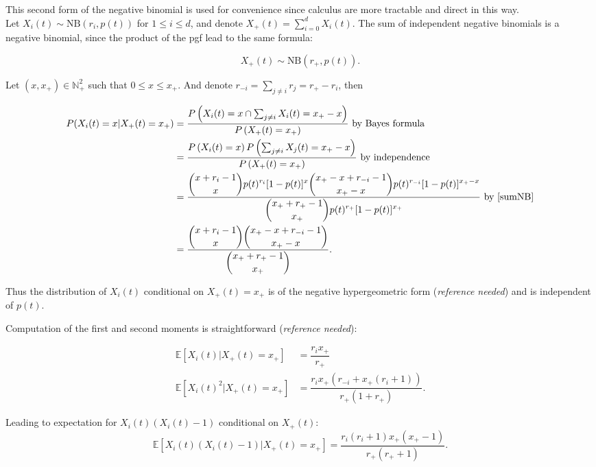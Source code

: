\documentclass{article}
\begin{document}
This second form of the negative binomial is used for convenience since calculus are more tractable and direct in this way.\\


Let $X_i(t) \sim \textrm{NB}(r_i,p(t))$ for $1 \leq i \leq d$, and denote $X_+(t)=\sum_{i=0}^d X_i(t)$. The sum of independent negative binomials is a negative binomial, since the product of the pgf lead to the same formula:

\begin{equation}
 X_+(t)  \sim \textrm{NB} \left( r_+, p(t) \right). \label{sumNB}
\end{equation}


Let $(x,x_+) \in \mathbb{N}_+^2$ such that $0 \leq x \leq x_+$. And denote $ \displaystyle r_{-i}=\sum_{j \neq i} r_j=r_+-r_i$, then

\begin{align}
P( X_i(t)=x \vert X_+(t)=x_+ ) &=\dfrac{P\left( X_i(t)=x \cap \sum_{j \neq i} X_i(t)=x_+-x \right)}{P\left(X_+(t)=x_+\right)} \text{ by Bayes formula}\\
 &=\dfrac{P\left(X_i(t)=x\right) P\left(\sum_{j \neq i} X_j(t)=x_+-x\right)}{P\left(X_+(t)=x_+\right)} \text{ by independence}\\
 &=\dfrac{\displaystyle \binom{x+r_i-1}{x} p(t)^{r_i} [1-p(t)]^{x} \binom{x_+-x+r_{-i}-1}{x_+-x} p(t)^{r_{-i}} [1-p(t)]^{x_+-x} }{\displaystyle \binom{x_++r_+ -1}{x_+} p(t)^{r_+ } [1-p(t)]^{x_+}} \text{ by \eqref{sumNB}} \\
 &=\dfrac{\displaystyle \binom{x+r_i-1}{x} \binom{x_+-x+r_{-i}-1}{x_+-x}}{\displaystyle \binom{x_+ +r_+ -1}{x_+}}.
\end{align}
 
 Thus the distribution of $X_i(t)$ conditional on $ X_+(t)=x_+$ is of the negative hypergeometric form (\textit{reference needed}) and is independent of $p(t)$.
 
 Computation of the first and second moments is straightforward (\textit{reference needed}): 
 
\begin{align}
\mathbb{E} [ X_i(t) \vert X_+(t)=x_+ ] &=\dfrac{r_i x_+}{r_+ } \\
\mathbb{E} [ X_i(t)^2 \vert X_+(t)=x_+ ] &=\dfrac{r_i x_+ (r_{-i} +x_+ (r_i+1))}{r_+ (1+r_+ )}.
\end{align}

Leading to expectation for $X_i(t)(X_i(t)-1)$ conditional on $X_+(t)$:
\begin{equation}
 \mathbb{E} [ X_i(t)(X_i(t)-1) \vert X_+(t)=x_+ ] =\dfrac{r_i(r_i+1) x_+ ( x_+ -1 ) }{r_+ (r_+ +1 )}. \label{condexpX}
\end{equation}
\end{document}
